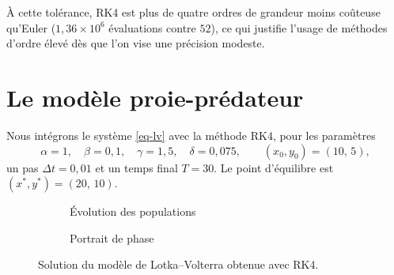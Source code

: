 À cette tolérance, RK4 est plus de quatre ordres de grandeur moins coûteuse qu'Euler ($1{,}36\times10^{6}$ évaluations contre $52$), ce qui justifie l'usage de méthodes d'ordre élevé dès que l'on vise une précision modeste.

\section{Le modèle proie-prédateur}\label{sec-exp-lv}

Nous intégrons le système \eqref{eq-lv} avec la méthode RK4, pour les paramètres
\[
  \alpha=1,\quad \beta=0{,}1,\quad \gamma=1{,}5,\quad \delta=0{,}075,
  \qquad (x_0,y_0)=(10,\,5),
\]
un pas $\Delta t=0{,}01$ et un temps final $T=30$. Le point d'équilibre est $(x^\ast,y^\ast)=(20,\,10)$.

\begin{figure}[htbp]
  \centering
  \begin{subfigure}[t]{0.49\textwidth}
    \centering
    \caption{Évolution des populations}
  \end{subfigure}\hfill
  \begin{subfigure}[t]{0.49\textwidth}
    \centering
    \caption{Portrait de phase}
  \end{subfigure}
  \caption{Solution du modèle de Lotka--Volterra obtenue avec RK4.}\label{fig-lv}
\end{figure}

